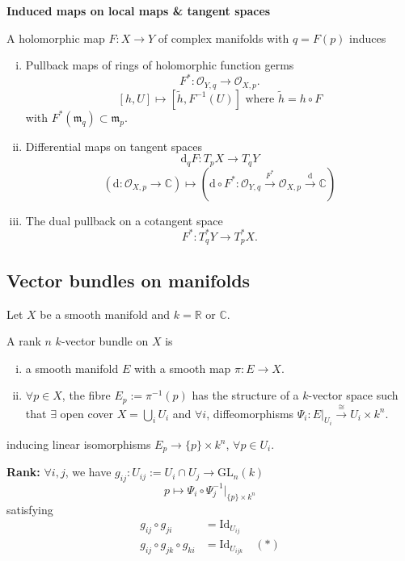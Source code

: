 \documentclass{article}
\begin{document}
\textbf{Induced maps on local maps \& tangent spaces}

A holomorphic map $F: X \to Y$ of complex manifolds with $q = F(p)$ induces
\begin{enumerate}[(i)]
    \item Pullback maps of rings of holomorphic function germs
    $$F^*: \mathcal{O}_{Y,q} \to \mathcal{O}_{X,p}.$$
    $$[h, U] \mapsto [\tilde{h}, F^{-1}(U)] \text{ where } \tilde{h} = h \circ F$$
    with $F^*(\mathfrak{m}_q) \subset \mathfrak{m}_p$.
    \item Differential maps on tangent spaces
    $$\mathrm{d}_q F: T_p X \to T_q Y$$
    $$\left(\mathrm{d}: \mathcal{O}_{X,p} \to \mathbb{C}\right) \mapsto \left(\mathrm{d} \circ F^*: \mathcal{O}_{Y,q} \xrightarrow{F^*} \mathcal{O}_{X,p} \xrightarrow{\mathrm{d}} \mathbb{C}\right)$$
    \item The dual pullback on a cotangent space
    $$F^*: T_q^* Y \to T_p^* X.$$
\end{enumerate}

\subsection{Vector bundles on manifolds}

Let $X$ be a smooth manifold and $k = \mathbb{R}$ or $\mathbb{C}$.

\begin{definition}
A rank $n$ $k$-vector bundle on $X$ is
\begin{enumerate}[(i)]
    \item a smooth manifold $E$ with a smooth map $\pi: E \to X$.
    \item $\forall p \in X$, the fibre $E_p := \pi^{-1}(p)$ has the structure of a ${k}$-vector space such that $\exists$ open cover $X = \bigcup_i U_i$ and $\forall i$, diffeomorphisms $\Psi_i: E|_{U_i} \xrightarrow{\cong} U_i \times {k}^n$.
\end{enumerate}
inducing linear isomorphisms $E_p \to \{p\} \times {k}^n$, $\forall p \in U_i$.
\end{definition}

\begin{remark}
\textbf{Rank:} $\forall i,j$, we have $g_{ij}: U_{ij} := U_i \cap U_j \to \mathrm{GL}_n(k)$
$$p \mapsto \Psi_i \circ \Psi_j^{-1}|_{ \{p\} \times k^n }$$
satisfying
\begin{align*}
    g_{ij} \circ g_{ji} &= \mathrm{Id}_{U_{ij}} \\
    g_{ij} \circ g_{jk} \circ g_{ki} &= \mathrm{Id}_{U_{ijk}} \quad (*)
\end{align*}
\end{remark}
\end{document}
